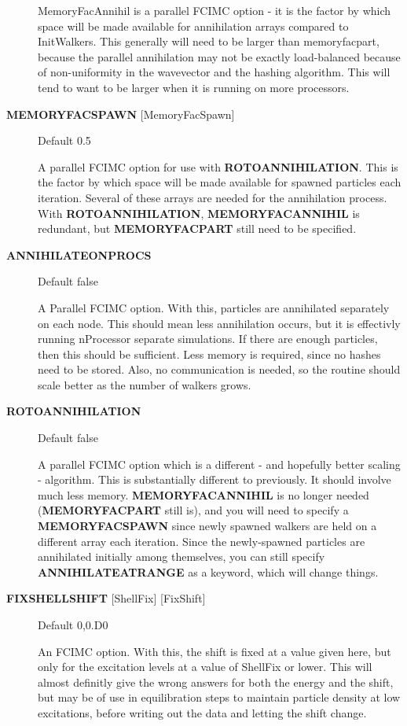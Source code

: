 \documentclass[openany,a4paper,10pt,english]{manual}
\begin{document}
\begin{description}
MemoryFacAnnihil is a parallel FCIMC option - it is the factor by which space will be
made available for annihilation arrays compared to InitWalkers. This generally will need to be
larger than memoryfacpart, because the parallel annihilation may not be exactly load-balanced because of
non-uniformity in the wavevector and the hashing algorithm. This will tend to want to be larger
when it is running on more processors.

\item[\textbf{MEMORYFACSPAWN} {[}MemoryFacSpawn{]}] \leavevmode
Default 0.5

A parallel FCIMC option for use with \textbf{ROTOANNIHILATION}. This is the factor by which space will be made
available for spawned particles each iteration. Several of these arrays are needed for the annihilation
process. With \textbf{ROTOANNIHILATION}, \textbf{MEMORYFACANNIHIL} is redundant, but \textbf{MEMORYFACPART} still need to be specified.

\item[\textbf{ANNIHILATEONPROCS}] \leavevmode
Default false

A Parallel FCIMC option. With this, particles are annihilated separately on each node.
This should mean less annihilation occurs, but it is effectivly running nProcessor
separate simulations. If there are enough particles, then this should be sufficient.
Less memory is required, since no hashes need to be stored. Also, no communication is
needed, so the routine should scale better as the number of walkers grows.

\item[\textbf{ROTOANNIHILATION}] \leavevmode
Default false

A parallel FCIMC option which is a different - and hopefully better scaling - algorithm.
This is substantially different to previously. It should involve much less memory.
\textbf{MEMORYFACANNIHIL} is no longer needed (\textbf{MEMORYFACPART} still is), and you will need
to specify a \textbf{MEMORYFACSPAWN} since newly spawned walkers are held on a different array each iteration.
Since the newly-spawned particles are annihilated initially among themselves, you can still
specify \textbf{ANNIHILATEATRANGE} as a keyword, which will change things.

\item[\textbf{FIXSHELLSHIFT} {[}ShellFix{]} {[}FixShift{]}] \leavevmode
Default 0,0.D0

An FCIMC option. With this, the shift is fixed at a value given here,
but only for the excitation levels at a value of ShellFix or lower. This will
almost definitly give the wrong answers for both the energy and the shift,
but may be of use in equilibration steps to maintain particle density at
low excitations, before writing out the data and letting the shift change.

\end{description}
\end{document}
